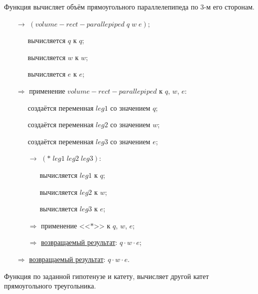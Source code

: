 \newpage
\problem Функция вычисляет объём прямоугольного параллелепипеда по 3-м его сторонам.\\[0.1cm]

\vspace{0.2cm}

\begin{itemize}
	\item[$\longrightarrow$] $(volume\!-\!rect\!-\!parallepiped\; q\; w\; e)$;
	\begin{itemize}
		\item[\textbullet] вычисляется $q$ к $q$;
		\item[\textbullet] вычисляется $w$ к $w$;
		\item[\textbullet] вычисляется $e$ к $e$;
	\end{itemize}
	\item[$\Longrightarrow$] применение $volume\!-\!rect\!-\!parallepiped$ к $q$, $w$, $e$:
	\begin{itemize}
		\item[\textbullet] создаётся переменная $leg1$ со значением $q$;
		\item[\textbullet] создаётся переменная $leg2$ со значением $w$;
		\item[\textbullet] создаётся переменная $leg3$ со значением $e$;
		\item[$\longrightarrow$] $(*\; leg1\; leg2\; leg3)$:
		\begin{itemize}
			\item[\textbullet] вычисляется $leg1$ к $q$;
			\item[\textbullet] вычисляется $leg2$ к $w$;
			\item[\textbullet] вычисляется $leg3$ к $e$;
		\end{itemize}
		\item[$\Longrightarrow$] применение <<$*$>> к $q$, $w$, $e$;
		\item[$\Longrightarrow$] \underline{возвращаемый результат}: $q \cdot w \cdot e$;
	\end{itemize}
	\item[$\Longrightarrow$] \underline{возвращаемый результат}: $q \cdot w \cdot e$.
\end{itemize}


\newpage
\problem Функция по заданной гипотенузе и катету, вычисляет другой катет прямоугольного треугольника.\\[0.1cm]


